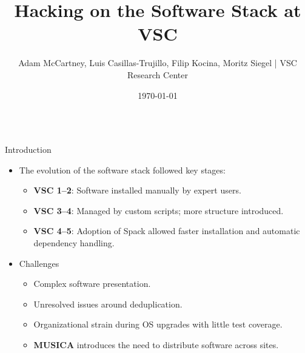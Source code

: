 \documentclass[final]{beamer}
\title{Hacking on the Software Stack at VSC}
\author{Adam McCartney, Luis Casillas-Trujillo, Filip Kocina, Moritz Siegel
\quad | \quad VSC Research Center}
\date{\today}
\begin{document}
\begin{frame}[t]

\begin{center}
  \vspace{1cm}
  \Huge \textbf{\inserttitle}
  
  \vspace{0.5cm}
  \Large \insertauthor
  
  \vspace{1cm}
\end{center}

\begin{columns}[t]
  \begin{column}{0.48\textwidth}
    \begin{block}{Introduction}
     \begin{itemize}
      \item The evolution of the software stack followed key stages:
      \begin{itemize}
        \item \textbf{VSC 1–2}: Software installed manually by expert users.
        \item \textbf{VSC 3–4}: Managed by custom scripts; more structure introduced.
        \item \textbf{VSC 4–5}: Adoption of Spack allowed faster installation and automatic dependency handling.
      \end{itemize}
      \item Challenges
      \begin{itemize}
        \item Complex software presentation.
        \item Unresolved issues around deduplication.
        \item Organizational strain during OS upgrades with little test coverage.
        \item \textbf{MUSICA} introduces the need to distribute software across sites.
      \end{itemize}
     \end{itemize}
    \end{block}
    \vfill


\end{column}
\end{columns}
\end{frame}
\end{document}
